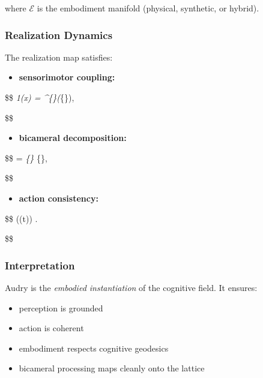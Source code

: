 where \(\mathcal{E}\) is the embodiment manifold (physical, synthetic, or hybrid).

\subsubsection{Realization Dynamics}\label{realization-dynamics}

The realization map satisfies:

\begin{itemize}
\tightlist
\item
  \textbf{sensorimotor coupling:}
\end{itemize}

\$\$ \emph{1(x) = \^{}\{\ast\}(}\{\}),

\$\$

\begin{itemize}
\tightlist
\item
  \textbf{bicameral decomposition:}
\end{itemize}

\$\$  = \emph{\{\} \oplus {}}\{\},

\$\$

\begin{itemize}
\tightlist
\item
  \textbf{action consistency:}
\end{itemize}

\$\$ (\gamma(t))  .

\$\$

\subsubsection{Interpretation}\label{interpretation-2}

Audry is the \emph{embodied instantiation} of the cognitive field. It ensures:

\begin{itemize}
\tightlist
\item
  perception is grounded\\
\item
  action is coherent\\
\item
  embodiment respects cognitive geodesics\\
\item
  bicameral processing maps cleanly onto the lattice
\end{itemize}

